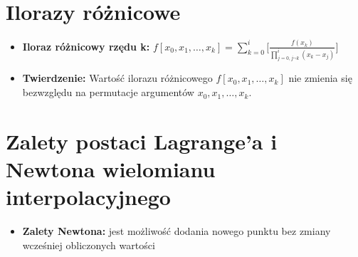 \documentclass[11pt]{article}
\begin{document}
\section{Ilorazy różnicowe}
\begin{itemize}
    \item \textbf{Iloraz różnicowy rzędu k: }\quad $f[x_0,x_1,\dots,x_k] = \sum_{k=0}^i \bigg[\frac{f(x_k)}{\prod_{j=0,j \neg k}^i(x_k - x_j)}\bigg]$
    \item \textbf{Twierdzenie: }Wartość ilorazu różnicowego $f[x_0,x_1,\dots,x_k]$ nie zmienia się bezwzględu na permutacje argumentów $x_0,x_1,\dots,x_k$.
\end{itemize}

\section{Zalety postaci Lagrange’a i Newtona wielomianu interpolacyjnego}
\begin{itemize}
    \item \textbf{Zalety Newtona: } jest możliwość dodania nowego punktu bez zmiany wcześniej obliczonych wartości
\end{itemize}
\end{document}
